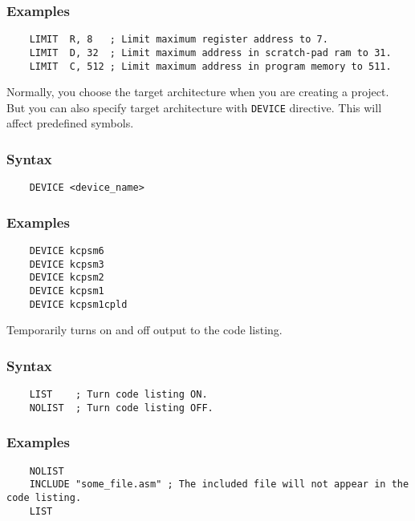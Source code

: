         \subsubsection{Examples}
            \verb'    LIMIT  R, 8   ; Limit maximum register address to 7.'\\
            \verb'    LIMIT  D, 32  ; Limit maximum address in scratch-pad ram to 31. '\\
            \verb'    LIMIT  C, 512 ; Limit maximum address in program memory to 511.'

    \clearpage
        Normally, you choose the target architecture when you are creating a project. But you can also specify target architecture with \texttt{DEVICE} directive. This will affect predefined symbols.

        \subsubsection{Syntax}
            \verb'    DEVICE <device_name>'

        \subsubsection{Examples}
            \verb'    DEVICE kcpsm6'\\
            \verb'    DEVICE kcpsm3'\\
            \verb'    DEVICE kcpsm2'\\
            \verb'    DEVICE kcpsm1'\\
            \verb'    DEVICE kcpsm1cpld'

        Temporarily turns on and off output to the code listing.

        \subsubsection{Syntax}
            \verb'    LIST    ; Turn code listing ON.'\\
            \verb'    NOLIST  ; Turn code listing OFF.'

        \subsubsection{Examples}
            \verb'    NOLIST'\\
            \verb'    INCLUDE "some_file.asm" ; The included file will not appear in the code listing.'\\
            \verb'    LIST'

